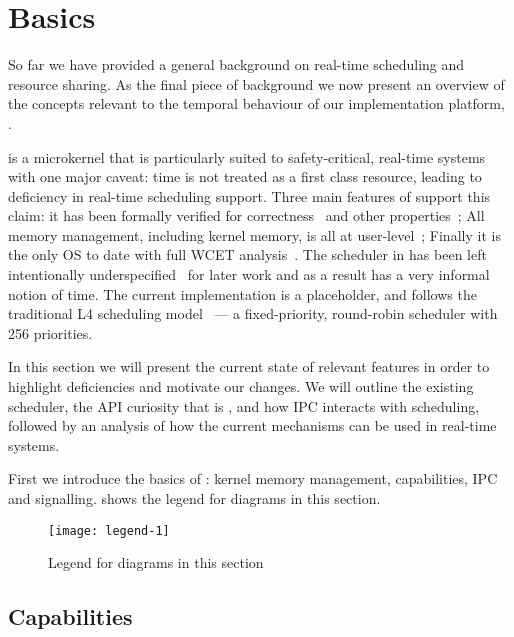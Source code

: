 

\chapter{\selfour Basics}
\label{chap:sel4}

So far we have provided a general background on real-time scheduling and resource sharing.
As the final piece of background we now present an overview of the concepts relevant to the temporal behaviour of our implementation platform, \selfour.

\selfour is a microkernel that is particularly suited to safety-critical, real-time systems with one
major caveat: time is not treated as a first class resource, leading to deficiency in real-time scheduling support. 
Three main features of \selfour support this claim: it has been formally verified for correctness~\citep{Klein_EHACDEEKNSTW_09} and other properties~\citep{Sewell_WGMAK_11}; All memory management, including kernel memory, is all at user-level~\citep{Elkaduwe_Derrin_06}; Finally it is the only \gls{OS} to date with full \gls{WCET} analysis~\citep{Blackham_SCRH_11}.
The scheduler in \selfour has been left intentionally underspecified~\citep{Petters_EH_12} for later work and as a result has a very informal notion of time.
The current implementation is a placeholder, and follows the traditional L4 scheduling model~\citep{Ruocco_06} --- a fixed-priority, round-robin scheduler with 256 priorities.

In this section we will present the current state of relevant \selfour features in order to highlight deficiencies and motivate our changes.
We will outline the existing scheduler, the API curiosity that is \yield, and how \gls{IPC} interacts with scheduling, followed by an analysis of how the current mechanisms can be used in real-time systems.


First we introduce the basics of \selfour: kernel memory management, capabilities, \gls{IPC} and
signalling.  shows the legend for diagrams in this section. 

\begin{figure}
    \centering
    \texttt{[image: legend-1]}
    \caption{Legend for diagrams in this section}
    \label{f:legend-1}
\end{figure}

\section{Capabilities}
\label{s:capabilities}

